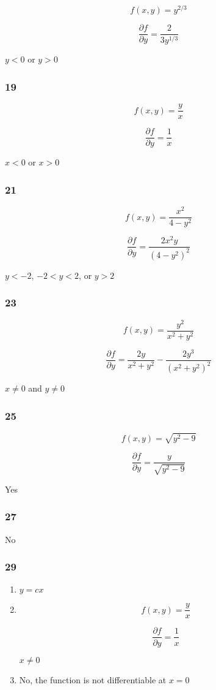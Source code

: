\documentclass{article}
\begin{document}
\[f(x, y) = y^{2 / 3}\]

\[\frac{\partial f}{\partial y} = \frac{2}{3 y^{1 / 3}}\]

$y < 0$ or $y > 0$

\subsubsection{19}

\[f(x, y) = \frac{y}{x}\]

\[\frac{\partial f}{\partial y} = \frac{1}{x}\]

$x < 0$ or $x > 0$

\subsubsection{21}

\[f(x, y) = \frac{x^2}{4 - y^2}\]

\[\frac{\partial f}{\partial y} = \frac{2 x^2 y}{(4 - y^2)^2}\]

$y < -2$, $-2 < y < 2$, or $y > 2$

\subsubsection{23}

\[f(x, y) = \frac{y^2}{x^2 + y^2}\]

\[\frac{\partial f}{\partial y} = \frac{2 y}{x^2 + y^2} - \frac{2 y^3}{(x^2 + y^2)^2}\]

$x \ne 0$ and $y \ne 0$

\subsubsection{25}

\[f(x, y) = \sqrt{y^2 - 9}\]

\[\frac{\partial f}{\partial y} = \frac{y}{\sqrt{y^2 - 9}}\]

Yes

\subsubsection{27}

No

\subsubsection{29}

\begin{enumerate}
  \item $y = c x$

  \item

        \[f(x, y) = \frac{y}{x}\]

        \[\frac{\partial f}{\partial y} = \frac{1}{x}\]

        $x \ne 0$

  \item No, the function is not differentiable at $x = 0$
\end{enumerate}
\end{document}
